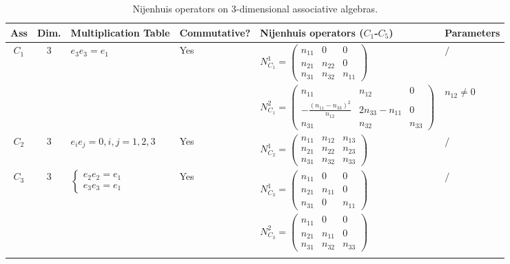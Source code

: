 \documentclass[12pt, reqno]{amsart}
\theoremstyle{plain}
\begin{document}
\begin{table}[H]
    \centering
    \tiny
    \caption{Nijenhuis operators on 3-dimensional associative algebras.}
    \setlength{\tabcolsep}{1.5pt}
    \begin{tabular}{|c|c|l|l|l|l|}
    \hline
    \textbf{Ass} & \textbf{Dim.} & \textbf{Multiplication Table} & \textbf{Commutative?} & \textbf{Nijenhuis operators} ($C_1$-$C_5$) & \textbf{Parameters} \\
    \hline
    $C_1$ & 3 & $e_3 e_3 = e_1$ & Yes & 
    $N_{C_1}^1 = \begin{pmatrix} n_{11} & 0 & 0 \\ n_{21} & n_{22} & 0 \\ n_{31} & n_{32} & n_{11} \end{pmatrix}$ & $/$ \\
    & & & & 
    $N_{C_1}^2 = \begin{pmatrix} n_{11} & n_{12} & 0 \\ -\frac{(n_{11}-n_{33})^2}{n_{12}} & 2n_{33}-n_{11} & 0 \\ n_{31} & n_{32} & n_{33} \end{pmatrix}$ & $n_{12}\neq0$ \\
    \hline
    $C_2$ & 3 & $e_i e_j =0, i,j=1,2,3$ & Yes & 
    $N_{C_2}^1 = \begin{pmatrix} n_{11} & n_{12} & n_{13} \\ n_{21} & n_{22} & n_{23} \\ n_{31} & n_{32} & n_{33} \end{pmatrix}$ & $/$ \\
    \hline
    \multirow{9}{*}{$C_3$} & \multirow{9}{*}{3} & \multirow{9}{*}{$\begin{cases} e_2 e_2 = e_1 \\ e_3 e_3 = e_1 \end{cases}$} & \multirow{9}{*}{Yes} & 
    $N_{C_3}^1 = \begin{pmatrix} n_{11} & 0 & 0 \\ n_{21} & n_{11} & 0 \\ n_{31} & 0 & n_{11} \end{pmatrix}$ & $/$\\
    \cline{5-6}
    & & & &  $N_{C_3}^2 = \begin{pmatrix} n_{11} & 0 & 0 \\ n_{21} & n_{11} & 0 \\ n_{31} & n_{32} & n_{33} \end{pmatrix}$& \makecell[l]{$n_{33}=n_{11}\pm n_{32}\sqrt{-1},$\\$n_{32}\neq0$}  \\  %

\end{tabular}
\end{table}
\end{document}
